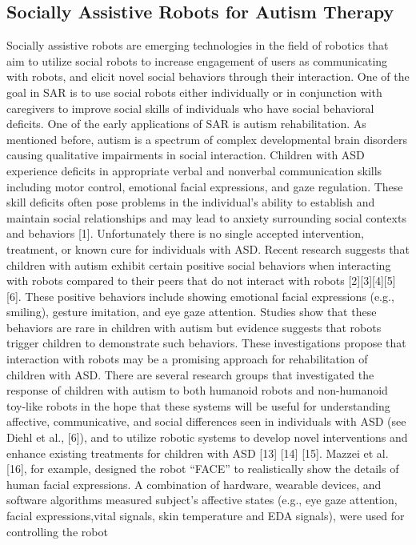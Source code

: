 \subsection{Socially Assistive Robots for Autism Therapy}
Socially assistive robots are emerging technologies in the field of robotics that aim
to utilize social robots to increase engagement of users as communicating with robots, and
elicit novel social behaviors through their interaction. One of the goal in SAR is to use
social robots either individually or in conjunction with caregivers to improve social skills
of individuals who have social behavioral deficits. One of the early applications of SAR is
autism rehabilitation. As mentioned before, autism is a spectrum of complex
developmental brain disorders causing qualitative impairments in social interaction.
Children with ASD experience deficits in appropriate verbal and nonverbal communication
skills including motor control, emotional facial expressions, and gaze regulation. These
skill deficits often pose problems in the individual’s ability to establish and maintain social
relationships and may lead to anxiety surrounding social contexts and behaviors [1].
Unfortunately there is no single accepted intervention, treatment, or known cure for
individuals with ASD.
Recent research suggests that children with autism exhibit certain positive social
behaviors when interacting with robots compared to their peers that do not interact with
robots [2][3][4][5][6]. These positive behaviors include showing emotional facial
expressions (e.g., smiling), gesture imitation, and eye gaze attention. Studies show that
these behaviors are rare in children with autism but evidence suggests that robots trigger
children to demonstrate such behaviors. These investigations propose that interaction with
robots may be a promising approach for rehabilitation of children with ASD.
There are several research groups that investigated the response of children with
autism to both humanoid robots and non-humanoid toy-like robots in the hope that these
systems will be useful for understanding affective, communicative, and social differences
seen in individuals with ASD (see Diehl et al., [6]), and to utilize robotic systems to develop
novel interventions and enhance existing treatments for children with ASD [13] [14] [15].
Mazzei et al. [16], for example, designed the robot “FACE” to realistically show the details
of human facial expressions. A combination of hardware, wearable devices, and software
algorithms measured subject’s affective states (e.g., eye gaze attention, facial expressions,vital signals, skin temperature and EDA signals), were used for controlling the robot
